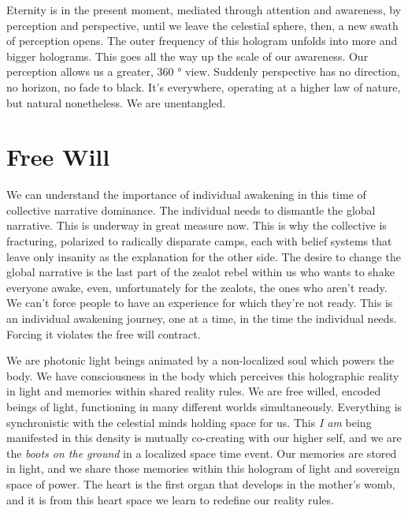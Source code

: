 \documentclass[letterpaper,11pt,twoside,titlepage,onecolumn,openany]{book}
\begin{document}
Eternity is in the present moment, mediated through attention and
awareness, by perception and perspective, until we leave the celestial
sphere, then, a new swath of perception opens. The outer frequency of
this hologram unfolds into more and bigger holograms. This goes all the
way up the scale of our awareness. Our perception allows us a greater,
360 ° view. Suddenly perspective has no direction, no horizon, no fade
to black. It's everywhere, operating at a higher law of nature, but
natural nonetheless. We are unentangled.

\section*{Free Will}\label{free-will}

We can understand the importance of individual awakening in this time of
collective narrative dominance. The individual needs to dismantle the
global narrative. This is underway in great measure now. This is why the
collective is fracturing, polarized to radically disparate camps, each
with belief systems that leave only insanity as the explanation for the
other side. The desire to change the global narrative is the last part
of the zealot rebel within us who wants to shake everyone awake, even,
unfortunately for the zealots, the ones who aren't ready. We can't force
people to have an experience for which they're not ready. This is an
individual awakening journey, one at a time, in the time the individual
needs. Forcing it violates the free will contract.

We are photonic light beings animated by a non-localized soul which
powers the body. We have consciousness in the body which perceives this
holographic reality in light and memories within shared reality rules.
We are free willed, encoded beings of light, functioning in many
different worlds simultaneously. Everything is synchronistic with the
celestial minds holding space for us. This \emph{I am} being manifested
in this density is mutually co-creating with our higher self, and we are
the \emph{boots on the ground} in a localized space time event. Our
memories are stored in light, and we share those memories within this
hologram of light and sovereign space of power. The heart is the first
organ that develops in the mother's womb, and it is from this heart
space we learn to redefine our reality rules.
\end{document}
